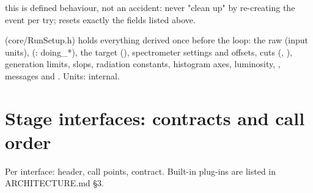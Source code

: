 \begin{simcwarning}
this is defined behaviour, not an accident: never "clean up" by re-creating the event per try;
 resets exactly the fields listed above.
\end{simcwarning}
 (core/\allowbreak{}RunSetup.\allowbreak{}h) holds everything derived once before the loop: the raw  (input units), 
(: doing\_*), the target (), spectrometer settings and offsets, cuts (,
), generation limits, slops, radiation constants, histogram axes, luminosity, , messages and
. Units: internal.

\section{\texorpdfstring{Stage interfaces: contracts and call order}{Stage interfaces: contracts and call order}}\label{developer_manual-03u5farchitecture:35-stage-interfaces-contracts-and-call-order}
Per interface: header, call points, contract. Built-in plug-ins are listed in ARCHITECTURE.md §3.

